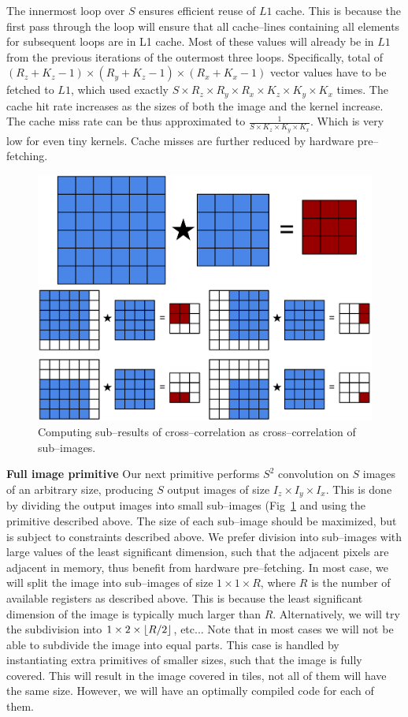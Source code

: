   The innermost loop over $S$ ensures efficient reuse of $L1$ cache.
  This is because the first pass through the loop will ensure that all
  cache--lines containing all elements for subsequent loops are in L1
  cache.  Most of these values will already be in $L1$ from the
  previous iterations of the outermost three loops.  Specifically,
  total of $(R_z+K_z-1) \times (R_y+K_z-1) \times (R_x+K_x-1)$ vector
  values have to be fetched to $L1$, which used exactly $S \times R_z
  \times R_y \times R_x \times K_z \times K_y \times K_x$ times.  The
  cache hit rate increases as the sizes of both the image and the
  kernel increase.  The cache miss rate can be thus approximated to
  $\frac{1}{S \times K_z \times K_y \times K_x}$.  Which is very low
  for even tiny kernels.  Cache misses are further reduced by hardware
  pre--fetching.

  \begin{figure}
    \begin{center}
      \includegraphics[width=0.57\linewidth]{fig/division}
    \end{center}
    \caption{Computing sub--results of cross--correlation as
      cross--correlation of sub--images.}
    \label{fig:conv-division}
  \end{figure}

  {\bf Full image primitive} \quad Our next primitive performs $S^2$
  convolution on $S$ images of an arbitrary size, producing $S$ output
  images of size $I_z \times I_y \times I_x$.  This is done by
  dividing the output images into small sub--images
  (Fig~\ref{fig:conv-division} and using the primitive described
  above.  The size of each sub--image should be maximized, but is
  subject to constraints described above.  We prefer division into
  sub--images with large values of the least significant dimension,
  such that the adjacent pixels are adjacent in memory, thus benefit
  from hardware pre--fetching.  In most case, we will split the image
  into sub--images of size $1 \times 1 \times R$, where $R$ is the
  number of available registers as described above.  This is because
  the least significant dimension of the image is typically much
  larger than $R$.  Alternatively, we will try the subdivision into $1
  \times 2 \times \lfloor R/2\rfloor$, etc...  Note that in most cases we
  will not be able to subdivide the image into equal parts.  This case
  is handled by instantiating extra primitives of smaller sizes, such
  that the image is fully covered.  This will result in the image
  covered in tiles, not all of them will have the same size.  However,
  we will have an optimally compiled code for each of them.

